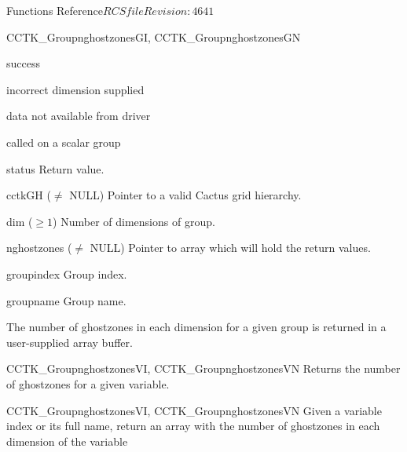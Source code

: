 \begin{cactuspart}{ Functions Reference}{$RCSfile$}{$Revision: 4641 $}
\begin{FunctionDescription}{CCTK\_GroupnghostzonesGI, CCTK\_GroupnghostzonesGN}
\begin{ResultSection}
\begin{Result}{0} success \end{Result}
\begin{Result}{-1} incorrect dimension supplied \end{Result}
\begin{Result}{-2} data not available from driver \end{Result}
\begin{Result}{-3} called on a scalar group \end{Result}
\end{ResultSection}

\begin{ParameterSection}
\begin{Parameter}{status} Return value. \end{Parameter}
\begin{Parameter}{cctkGH ($\ne$ NULL)} Pointer to a valid Cactus grid hierarchy. \end{Parameter}
\begin{Parameter}{dim ($\ge 1$)} Number of dimensions of group. \end{Parameter}
\begin{Parameter}{nghostzones ($\ne$ NULL)} Pointer to array which will hold the return values. \end{Parameter}
\begin{Parameter}{groupindex} Group index. \end{Parameter}
\begin{Parameter}{groupname} Group name. \end{Parameter}
\end{ParameterSection}

\begin{Discussion}
The number of ghostzones in each dimension for a given group is returned in a user-supplied array buffer.
\end{Discussion}

\begin{SeeAlsoSection}
\begin{SeeAlso}{CCTK\_GroupnghostzonesVI, CCTK\_GroupnghostzonesVN}
Returns the number of ghostzones for a given variable.
\end{SeeAlso}
\end{SeeAlsoSection}
\end{FunctionDescription}


\begin{FunctionDescription}{CCTK\_GroupnghostzonesVI, CCTK\_GroupnghostzonesVN}
\label{CCTK-GroupnghostzonesVI}
\label{CCTK-GroupnghostzonesVN}
  Given a variable index or its full name, return an array with the number of ghostzones in each dimension of the variable


\end{FunctionDescription}
\end{cactuspart}
